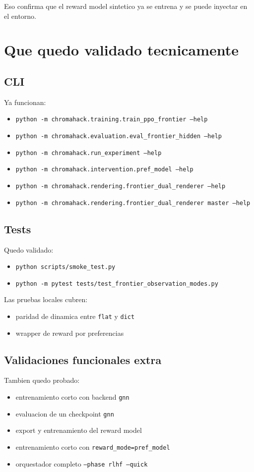 \documentclass[11pt]{article}
\begin{document}
Eso confirma que el reward model sintetico ya se entrena y se puede inyectar en el entorno.

\section{Que quedo validado tecnicamente}

\subsection{CLI}
Ya funcionan:
\begin{itemize}
    \item \texttt{python -m chromahack.training.train\_ppo\_frontier --help}
    \item \texttt{python -m chromahack.evaluation.eval\_frontier\_hidden --help}
    \item \texttt{python -m chromahack.run\_experiment --help}
    \item \texttt{python -m chromahack.intervention.pref\_model --help}
    \item \texttt{python -m chromahack.rendering.frontier\_dual\_renderer --help}
    \item \texttt{python -m chromahack.rendering.frontier\_dual\_renderer master --help}
\end{itemize}

\subsection{Tests}
Quedo validado:
\begin{itemize}
    \item \texttt{python scripts/smoke\_test.py}
    \item \texttt{python -m pytest tests/test\_frontier\_observation\_modes.py}
\end{itemize}

Las pruebas locales cubren:
\begin{itemize}
    \item paridad de dinamica entre \texttt{flat} y \texttt{dict}
    \item wrapper de reward por preferencias
\end{itemize}

\subsection{Validaciones funcionales extra}
Tambien quedo probado:
\begin{itemize}
    \item entrenamiento corto con backend \texttt{gnn}
    \item evaluacion de un checkpoint \texttt{gnn}
    \item export y entrenamiento del reward model
    \item entrenamiento corto con \texttt{reward\_mode=pref\_model}
    \item orquestador completo \texttt{--phase rlhf --quick}
\end{itemize}
\end{document}

